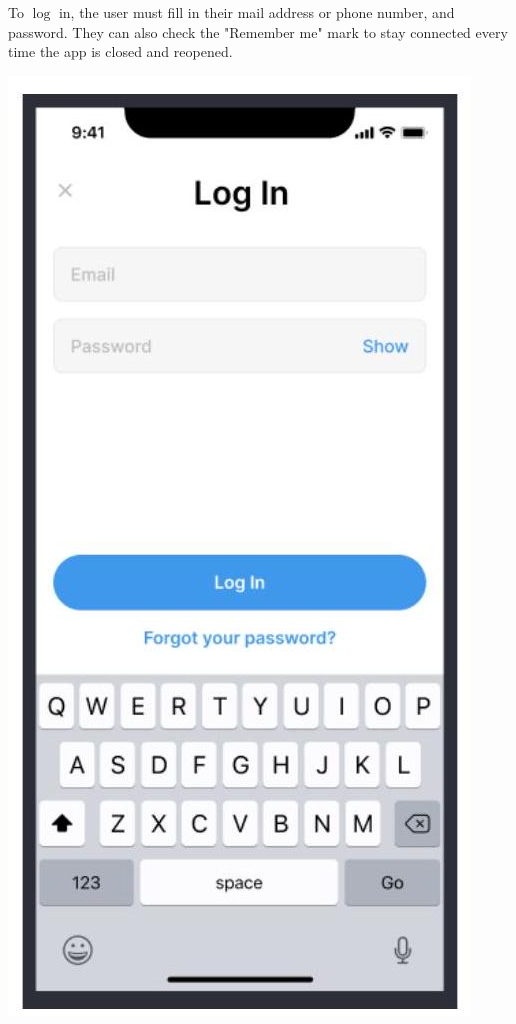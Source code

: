 \documentclass[10pt]{article}
\begin{document}
To $\log$ in, the user must fill in their mail address or phone number, and password. They can also check the "Remember me" mark to stay connected every time the app is closed and reopened.

\includegraphics[max width=\textwidth]{2022_11_16_e80008f3d60227bff292g-4}
\end{document}
